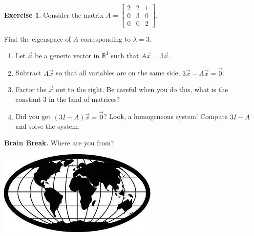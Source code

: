 \documentclass{beamer}
\newcommand{\R}{\mathbb{R}}
\newcommand{\fn}{\insertframenumber}
\theoremstyle{definition}
\newtheorem{exercise}{Exercise}
\begin{document}
\begin{frame}{\fn}
	\begin{exercise}\label{first}
		Consider the matrix $A=\begin{bmatrix}
		2&2&1\\0&3&0\\0&0&2
		\end{bmatrix}$.
		
		Find the eigenspace of $A$ corresponding to $\lambda =3$.
		\begin{enumerate}[label=(\alph*)]
			\item Let $\vec x$ be a generic vector in $\R^3$ such that $A\vec x=3\vec x$.
			\item Subtract $A\vec x$ so that all variables are on the same side, $3\vec x-A\vec x=\vec 0$.
			\item Factor the $\vec x$ out to the right.  Be careful when you do this, what is the constant 3 in the land of matrices?
			\item Did you get $(3I-A)\vec x=\vec 0$?  Look, a homogeneous system!  Compute $3I-A$ and solve the system.
		\end{enumerate}
	\end{exercise}
\end{frame}
\begin{frame}{\fn}
	\begin{block}{\textbf{Brain Break.}}
		Where are you from?
		\begin{center}
			\includegraphics[width=.7\textwidth]{images/world}
		\end{center}
	\end{block}
\end{frame}
\end{document}
